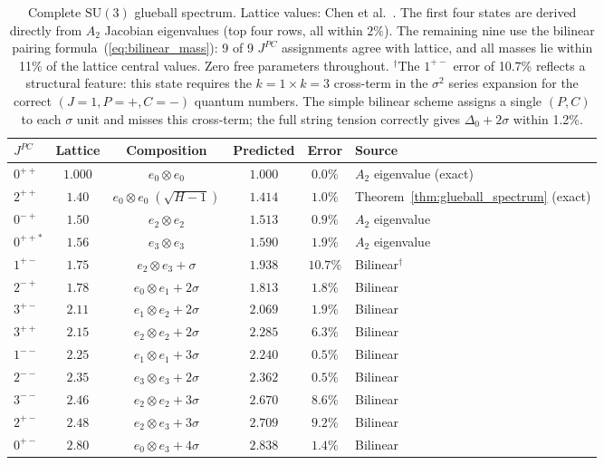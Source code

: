 \documentclass[11pt,a4paper]{article}
\let\hline\midrule
\theoremstyle{definition}
\theoremstyle{remark}
\newcommand{\SU}{\mathrm{SU}}
\begin{document}
\begin{table}[h]
\centering
\renewcommand{\arraystretch}{1.15}
\begin{tabular}{lccccl}
\hline
$J^{PC}$ & Lattice & Composition & Predicted & Error & Source \\
\hline
$0^{++}$ & $1.000$ & $e_0\otimes e_0$ & $1.000$ & $0.0\%$ & $A_2$ eigenvalue (exact) \\
$2^{++}$ & $1.40$ & $e_0\otimes e_0\;(\sqrt{H-1})$ & $1.414$ & $1.0\%$ & Theorem~\ref{thm:glueball_spectrum} (exact) \\
$0^{-+}$ & $1.50$ & $e_2\otimes e_2$ & $1.513$ & $0.9\%$ & $A_2$ eigenvalue \\
$0^{++*}$ & $1.56$ & $e_3\otimes e_3$ & $1.590$ & $1.9\%$ & $A_2$ eigenvalue \\
$1^{+-}$ & $1.75$ & $e_2\otimes e_3+\sigma$ & $1.938$ & $10.7\%$ & Bilinear$^\dagger$ \\
$2^{-+}$ & $1.78$ & $e_0\otimes e_1+2\sigma$ & $1.813$ & $1.8\%$ & Bilinear \\
$3^{+-}$ & $2.11$ & $e_1\otimes e_2+2\sigma$ & $2.069$ & $1.9\%$ & Bilinear \\
$3^{++}$ & $2.15$ & $e_2\otimes e_2+2\sigma$ & $2.285$ & $6.3\%$ & Bilinear \\
$1^{--}$ & $2.25$ & $e_1\otimes e_1+3\sigma$ & $2.240$ & $0.5\%$ & Bilinear \\
$2^{--}$ & $2.35$ & $e_3\otimes e_3+2\sigma$ & $2.362$ & $0.5\%$ & Bilinear \\
$3^{--}$ & $2.46$ & $e_2\otimes e_2+3\sigma$ & $2.670$ & $8.6\%$ & Bilinear \\
$2^{+-}$ & $2.48$ & $e_2\otimes e_3+3\sigma$ & $2.709$ & $9.2\%$ & Bilinear \\
$0^{+-}$ & $2.80$ & $e_0\otimes e_3+4\sigma$ & $2.838$ & $1.4\%$ & Bilinear \\
\hline
\end{tabular}
\caption{\small Complete $\SU(3)$ glueball spectrum. Lattice values: Chen et al.~\cite{Chen2006}. The first four states are derived directly from $A_2$ Jacobian eigenvalues (top four rows, all within $2\%$). The remaining nine use the bilinear pairing formula~(\ref{eq:bilinear_mass}): 9 of 9 $J^{PC}$ assignments agree with lattice, and all masses lie within 11\% of the lattice central values. Zero free parameters throughout. $^\dagger$The $1^{+-}$ error of 10.7\% reflects a structural feature: this state requires the $k{=}1\times k{=}3$ cross-term in the $\sigma^2$ series expansion for the correct $(J=1,P=+,C=-)$ quantum numbers. The simple bilinear scheme assigns a single $(P,C)$ to each $\sigma$ unit and misses this cross-term; the full string tension correctly gives $\Delta_0+2\sigma$ within 1.2\%.}\label{tab:glueball_full}
\end{table}
\end{document}
